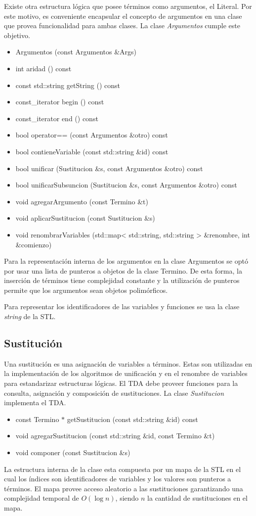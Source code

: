 \documentclass[a4paper,12pt]{article}
\begin{document}
Existe otra estructura lógica que posee términos como argumentos, el Literal. Por este motivo, es conveniente
encapsular el concepto de argumentos en una clase que provea funcionalidad para ambas clases. La clase \emph{Argumentos}
cumple este objetivo.
\begin{itemize}
\renewcommand{\labelitemi}{$\bullet$}
\item Argumentos (const Argumentos \&Args)
\item int aridad () const
\item const std::string getString () const
\item const\_iterator begin () const
\item const\_iterator end () const
\item bool operator== (const Argumentos \&otro) const
\item bool contieneVariable (const std::string \&id) const
\item bool unificar (Sustitucion \&s, const Argumentos \&otro) const
\item bool unificarSubsuncion (Sustitucion \&s, const Argumentos \&otro) const
\item void agregarArgumento (const Termino \&t)
\item void aplicarSustitucion (const Sustitucion \&s)
\item void renombrarVariables (std::map< std::string, std::string > \&renombre, int \&comienzo)
\end{itemize}
Para la representación interna de los argumentos en la clase Argumentos se optó por
usar una lista de punteros a objetos de la clase Termino. De esta forma, la inserción de términos
tiene complejidad constante y la utilización de punteros permite que los argumentos sean objetos polimórficos.

Para representar los identificadores de las variables y funciones se usa la clase \emph{string} de la STL.
\subsection{Sustitución}
Una sustitución es una asignación de variables a términos. Estas son utilizadas en la implementación de los
algoritmos de unificación y en el renombre de variables para estandarizar estructuras lógicas.
El TDA debe proveer funciones para la consulta, asignación y composición de sustituciones.
La clase \emph{Sustitucion} implementa el TDA.
\begin{itemize}
\renewcommand{\labelitemi}{$\bullet$}
\item const Termino $\ast$ getSustitucion (const std::string \&id) const
\item void agregarSustitucion (const std::string \&id, const Termino \&t)
\item void componer (const Sustitucion \&s)
\end{itemize}
La estructura interna de la clase esta compuesta por un mapa de la STL en el cual los
índices son identificadores de variables y los valores son punteros a términos. El mapa
provee acceso aleatorio a las sustituciones garantizando una complejidad temporal de 
$O(\log n)$, siendo $n$ la cantidad de sustituciones en el mapa.
\end{document}
